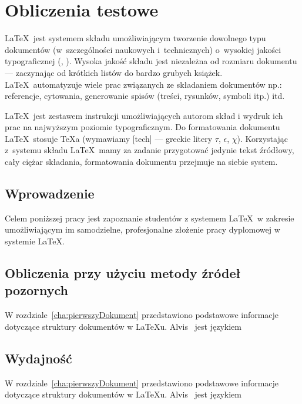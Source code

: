 \chapter{Obliczenia testowe}\label{cha:ot}

\LaTeX~jest systemem składu umożliwiającym tworzenie dowolnego typu dokumentów (w~szczególności naukowych i~technicznych) o~wysokiej jakości typograficznej (\cite{Dil00}, \cite{Lam92}). Wysoka jakość składu jest niezależna od rozmiaru dokumentu --- zaczynając od krótkich listów do bardzo grubych książek. \LaTeX~automatyzuje wiele prac związanych ze składaniem dokumentów np.: referencje, cytowania, generowanie spisów (treści, rysunków, symboli itp.) itd.

\LaTeX~jest zestawem instrukcji umożliwiających autorom skład i wydruk ich prac na najwyższym poziomie typograficznym. Do formatowania dokumentu \LaTeX~stosuje \TeX{}a (wymawiamy [tech] --- greckie litery $\tau$, $\epsilon$, $\chi$). Korzystając z~systemu składu \LaTeX~mamy za zadanie przygotować jedynie tekst źródłowy, cały ciężar składania, formatowania dokumentu przejmuje na siebie system.


\section{Wprowadzenie}\label{sec:wprowadzenie}


Celem poniższej pracy jest zapoznanie studentów z systemem \LaTeX~w zakresie umożliwiającym im samodzielne, profesjonalne złożenie pracy dyplomowej w systemie \LaTeX.



\section{Obliczenia przy użyciu metody źródeł pozornych}\label{sec:imstest}

W rozdziale~\ref{cha:pierwszyDokument} przedstawiono podstawowe informacje dotyczące struktury dokumentów w \LaTeX{}u. Alvis~\cite{Alvis2011} jest językiem 


\section{Wydajność}\label{sec:wyd}

W rozdziale~\ref{cha:pierwszyDokument} przedstawiono podstawowe informacje dotyczące struktury dokumentów w \LaTeX{}u. Alvis~\cite{Alvis2011} jest językiem 

















